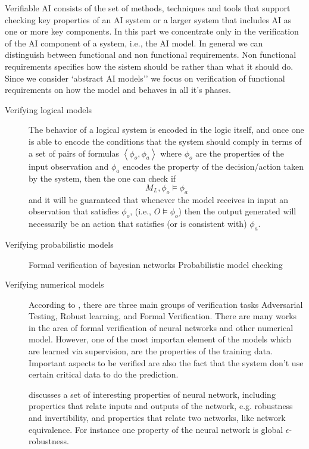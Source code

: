 Verifiable AI consists of the set of methods, techniques and tools
that support checking key properties of an AI system or a larger
system that includes AI as one or more key components.  In this part
we concentrate only in the verification of the AI component of a
system, i.e., the AI model. In general we can distinguish between
functional and non functional requirements. Non functional
requirements specifies how the sistem should be rather than what it
should do. Since we consider `abstract AI models'' we focus on
verification of functional requirements on how the model and behaves
in all it's phases. 
  
 \begin{description}
 \item[Verifying logical models] The behavior of a logical system is
   encoded in the logic itself, and once one is able to encode the
   conditions that the system should comply in terms of a set of pairs
   of formulas $\left<\phi_o,\phi_a\right>$ where $\phi_o$ are the
   properties of the input observation and $\phi_a$ encodes the
   property of the decision/action taken by the system, then the one
   can check if 
   $$
   M_L, \phi_o \models \phi_a
   $$
   and it will be guaranteed that whenever the model receives in input
   an observation that satisfies $\phi_o$, (i.e., $O\models \phi_o$)
   then the output generated will necessarily be an action that
   satisfies (or is consistent with) $\phi_a$.
   
 \item[Verifying probabilistic models]
   Formal verification of bayesian networks \cite{pmlr-v72-shih18a}
   Probabilistic model checking \cite{kwiatkowska2018probabilistic}

 \item[Verifying numerical models] According to
   \cite{kohli2019towards}, there are three main groups of
   verification tasks Adversarial Testing, Robust learning, and Formal
   Verification. There are many works in the area of formal
   verification of neural networks and other numerical model.
   However, one of the most importan element of the models which are
   learned via supervision, are the properties of the training data.
   Important aspects to be verified are also the fact that the system
   don't use certain critical data to do the prediction.

   \cite{narodytska2018formal} discusses a set of interesting
   properties of neural network, including properties that relate
   inputs and outputs of the network, e.g. robustness and
   invertibility, and properties that relate two networks, like
   network equivalence. For instance one property of the neural
   network is global $\epsilon$-robustness. 


\end{description}
